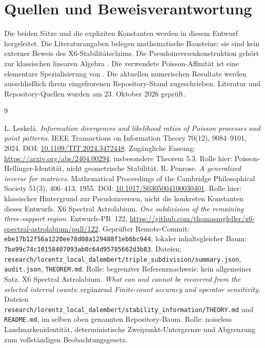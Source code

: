 \documentclass[11pt,a4paper]{article}
\theoremstyle{definition}\newtheorem{definition}{Definition}
\theoremstyle{remark}\newtheorem*{remark}{Bemerkung}
\begin{document}
\section{Quellen und Beweisverantwortung}

Die beiden Sätze und die expliziten Konstanten werden in diesem Entwurf hergeleitet. Die Literaturangaben belegen mathematische Bausteine; sie sind kein externer Beweis des X6-Stabilitätsclaims. Die Pseudoinversenkonstruktion gehört zur klassischen linearen Algebra \cite{penrose}. Die verwendete Poisson-Affinität ist eine elementare Spezialisierung von \cite{leskela}. Die aktuellen numerischen Resultate werden ausschließlich ihrem eingefrorenen Repository-Stand zugeschrieben. Literatur und Repository-Quellen wurden am 23. Oktober 2026 geprüft.

\begin{thebibliography}{9}
\raggedright
{}
L. Leskelä. \emph{Information divergences and likelihood ratios of Poisson processes and point patterns}. IEEE Transactions on Information Theory 70(12), 9084--9101, 2024. DOI: \href{https://doi.org/10.1109/TIT.2024.3472448}{10.1109/TIT.2024.3472448}. Zugängliche Fassung: \url{https://arxiv.org/abs/2404.00294}; insbesondere Theorem 5.3. Rolle hier: Poisson-Hellinger-Identität, nicht geometrische Stabilität.
R. Penrose. \emph{A generalized inverse for matrices}. Mathematical Proceedings of the Cambridge Philosophical Society 51(3), 406--413, 1955. DOI: \href{https://doi.org/10.1017/S0305004100030401}{10.1017/S0305004100030401}. Rolle hier: klassischer Hintergrund zur Pseudoinversen, nicht die konkreten Konstanten dieses Entwurfs.
X6 Spectral Astrolabium. \emph{One subdivision of the remaining three-support region}. Entwurfs-PR~122, \url{https://github.com/thomasmgfeller/x6-spectral-astrolabium/pull/122}. Geprüfter Remote-Commit: \texttt{ebe17b12f56a1220ee78d08a129488f1eb6bc944}; lokaler inhaltsgleicher Baum: \texttt{7ba99c74c10158407093ab0c64d95785662d3b83}. Dateien: \texttt{research/lorentz\_local\_dalembert/triple\_subdivision/}\allowbreak\texttt{summary.json}, \texttt{audit.json}, \texttt{THEOREM.md}. Rolle: begrenzter Referenznachweis; kein allgemeiner Satz.
X6 Spectral Astrolabium. \emph{What can and cannot be recovered from the selected interval counts}; ergänzend \emph{Finite-count accuracy and operator sensitivity}. Dateien \texttt{research/lorentz\_local\_dalembert/stability\_information/}\allowbreak\texttt{THEORY.md} und \texttt{README.md}, im selben oben genannten Repository-Baum. Rolle: noiseless Landmarkenidentität, deterministische Zweipunkt-Untergrenze und Abgrenzung zum vollständigen Beobachtungsgesetz.
\end{thebibliography}
\end{document}
